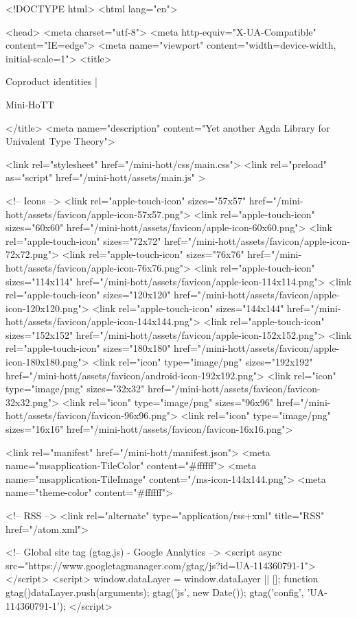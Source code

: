 <!DOCTYPE html>
<html lang="en">

<head>
  <meta charset="utf-8">
  <meta http-equiv="X-UA-Compatible" content="IE=edge">
  <meta name="viewport" content="width=device-width, initial-scale=1">
  <title>
    
      
        Coproduct identities |
      
        Mini-HoTT
    
  </title>
  <meta name="description" content="Yet another Agda Library for Univalent Type Theory">

  <link rel="stylesheet" href="/mini-hott/css/main.css">
  <link rel="preload" as="script" href="/mini-hott/assets/main.js" >

  <!-- Icons -->
  <link rel="apple-touch-icon" sizes="57x57" href="/mini-hott/assets/favicon/apple-icon-57x57.png">
  <link rel="apple-touch-icon" sizes="60x60" href="/mini-hott/assets/favicon/apple-icon-60x60.png">
  <link rel="apple-touch-icon" sizes="72x72" href="/mini-hott/assets/favicon/apple-icon-72x72.png">
  <link rel="apple-touch-icon" sizes="76x76" href="/mini-hott/assets/favicon/apple-icon-76x76.png">
  <link rel="apple-touch-icon" sizes="114x114" href="/mini-hott/assets/favicon/apple-icon-114x114.png">
  <link rel="apple-touch-icon" sizes="120x120" href="/mini-hott/assets/favicon/apple-icon-120x120.png">
  <link rel="apple-touch-icon" sizes="144x144" href="/mini-hott/assets/favicon/apple-icon-144x144.png">
  <link rel="apple-touch-icon" sizes="152x152" href="/mini-hott/assets/favicon/apple-icon-152x152.png">
  <link rel="apple-touch-icon" sizes="180x180" href="/mini-hott/assets/favicon/apple-icon-180x180.png">
  <link rel="icon" type="image/png" sizes="192x192"  href="/mini-hott/assets/favicon/android-icon-192x192.png">
  <link rel="icon" type="image/png" sizes="32x32" href="/mini-hott/assets/favicon/favicon-32x32.png">
  <link rel="icon" type="image/png" sizes="96x96" href="/mini-hott/assets/favicon/favicon-96x96.png">
  <link rel="icon" type="image/png" sizes="16x16" href="/mini-hott/assets/favicon/favicon-16x16.png">

  <link rel="manifest" href="/mini-hott/manifest.json">
  <meta name="msapplication-TileColor" content="#ffffff">
  <meta name="msapplication-TileImage" content="/ms-icon-144x144.png">
  <meta name="theme-color" content="#ffffff">

  <!-- RSS -->
  <link rel="alternate" type="application/rss+xml" title="RSS" href="/atom.xml">

  <!-- Global site tag (gtag.js) - Google Analytics -->
  <script async src="https://www.googletagmanager.com/gtag/js?id=UA-114360791-1"></script>
  <script>
    window.dataLayer = window.dataLayer || [];
    function gtag(){dataLayer.push(arguments);}
    gtag('js', new Date());
    gtag('config', 'UA-114360791-1');
  </script>

